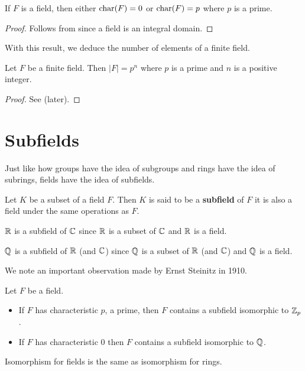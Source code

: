 \begin{proposition}
    If $F$ is a field, then either $\mathrm{char}(F) = 0$ or $\mathrm{char}(F) = p$ where $p$ is a prime.
\end{proposition}
\begin{proof}
    Follows from  since a field is an integral domain.
\end{proof}

With this result, we deduce the number of elements of a finite field.
\begin{theorem}\label{thrm-finite-field-has-prime-power-order}
    Let $F$ be a finite field. Then $|F| = p^n$ where $p$ is a prime and $n$ is a positive integer.
\end{theorem}
\begin{proof}
    See  (later).
\end{proof}

\section{Subfields}
Just like how groups have the idea of subgroups and rings have the idea of subrings, fields have the idea of subfields.
\begin{definition}
    Let $K$ be a subset of a field $F$. Then $K$ is said to be a \textbf{subfield} of $F$ it is also a field under the same operations as $F$.
\end{definition}

\begin{example}
    $\mathbb{R}$ is a subfield of $\mathbb{C}$ since $\mathbb{R}$ is a subset of $\mathbb{C}$ and $\mathbb{R}$ is a field.
\end{example}
\begin{example}
    $\mathbb{Q}$ is a subfield of $\mathbb{R}$ (and $\mathbb{C}$) since $\mathbb{Q}$ is a subset of $\mathbb{R}$ (and $\mathbb{C}$) and $\mathbb{Q}$ is a field.
\end{example}

\newpage

We note an important observation made by Ernst Steinitz in 1910.

\begin{theorem}\label{thrm-field-contains-subfield-isomorphic-to-Zp-or-Q}
    Let $F$ be a field.
    \begin{itemize}
        \item If $F$ has characteristic $p$, a prime, then $F$ contains a subfield isomorphic to $\mathbb{Z}_p$.
        \item If $F$ has characteristic 0 then $F$ contains a subfield isomorphic to $\mathbb{Q}$.
    \end{itemize}
\end{theorem}
\begin{remark}
    Isomorphism for fields is the same as isomorphism for rings.
\end{remark}

